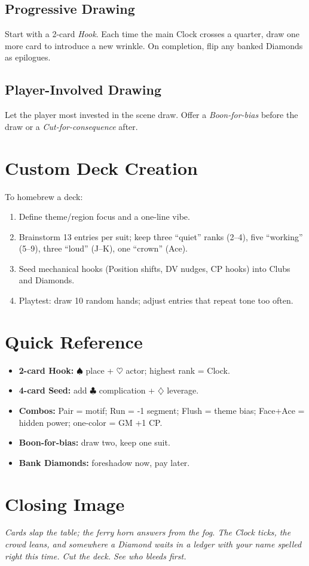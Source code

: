 \begin{multicols}{2}
\subsection*{Progressive Drawing}
Start with a 2-card \emph{Hook}. Each time the main Clock crosses a quarter, draw one more card to introduce a new wrinkle. On completion, flip any banked Diamonds as epilogues.

\subsection*{Player-Involved Drawing}
Let the player most invested in the scene draw. Offer a \emph{Boon-for-bias} before the draw or a \emph{Cut-for-consequence} after.

\section{Custom Deck Creation}
To homebrew a deck:
\begin{enumerate}
  \item Define theme/region focus and a one-line vibe.
  \item Brainstorm 13 entries per suit; keep three “quiet” ranks (2–4), five “working” (5–9), three “loud” (J–K), one “crown” (Ace).
  \item Seed mechanical hooks (Position shifts, DV nudges, CP hooks) into Clubs and Diamonds.
  \item Playtest: draw 10 random hands; adjust entries that repeat tone too often.
\end{enumerate}

\section*{Quick Reference}
\begin{tcolorbox}[colback=green!5!white,colframe=green!60!black,title=Deck Generators at a Glance,fonttitle=\bfseries]
\begin{itemize}
  \item \textbf{2-card Hook:} \(\spadesuit\) place + \(\heartsuit\) actor; highest rank = Clock.
  \item \textbf{4-card Seed:} add \(\clubsuit\) complication + \(\diamondsuit\) leverage.
  \item \textbf{Combos:} Pair = motif; Run = -1 segment; Flush = theme bias; Face+Ace = hidden power; one-color = GM +1 CP.
  \item \textbf{Boon-for-bias:} draw two, keep one suit.
  \item \textbf{Bank Diamonds:} foreshadow now, pay later.
\end{itemize}
\end{tcolorbox}

\section*{Closing Image}
\textit{Cards slap the table; the ferry horn answers from the fog. The Clock ticks, the crowd leans, and somewhere a Diamond waits in a ledger with your name spelled right this time. Cut the deck. See who bleeds first.}

\end{multicols}
